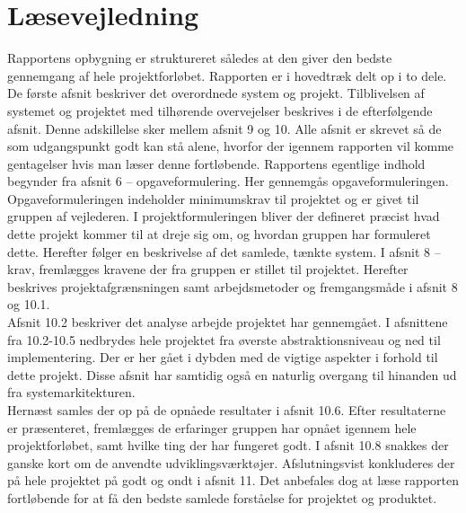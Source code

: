 \section{Læsevejledning}
Rapportens opbygning er struktureret således at den giver den bedste gennemgang af hele projektforløbet. Rapporten er i hovedtræk delt op i to dele. De første afsnit beskriver det overordnede system og projekt. Tilblivelsen af systemet og projektet med tilhørende overvejelser beskrives i de efterfølgende afsnit. Denne adskillelse sker mellem afsnit 9 og 10. Alle afsnit er skrevet så de som udgangspunkt godt kan stå alene, hvorfor der igennem rapporten vil komme gentagelser hvis man læser denne fortløbende. Rapportens egentlige indhold begynder fra afsnit 6 – opgaveformulering.  Her gennemgås opgaveformuleringen. Opgaveformuleringen indeholder minimumskrav til projektet og er givet til gruppen af vejlederen. I projektformuleringen bliver der defineret præcist hvad dette projekt kommer til at dreje sig om, og hvordan gruppen har formuleret dette. Herefter følger en beskrivelse af det samlede, tænkte system.
I afsnit 8 – krav, fremlægges kravene der fra gruppen er stillet til projektet. Herefter beskrives projektafgrænsningen samt arbejdsmetoder og fremgangsmåde i afsnit 8 og 10.1.\\
Afsnit 10.2 beskriver det analyse arbejde projektet har gennemgået. I afsnittene fra 10.2-10.5 nedbrydes hele projektet fra øverste abstraktionsniveau og ned til implementering. Der er her gået i dybden med de vigtige aspekter i forhold til dette projekt. Disse afsnit har samtidig også en naturlig overgang til hinanden ud fra systemarkitekturen. \\
Hernæst samles der op på de opnåede resultater i afsnit 10.6. Efter resultaterne er præsenteret, fremlægges de erfaringer gruppen har opnået igennem hele projektforløbet, samt hvilke ting der har fungeret godt. I afsnit 10.8 snakkes der ganske kort om de anvendte udviklingsværktøjer. Afslutningsvist konkluderes der på hele projektet på godt og ondt i afsnit 11. Det anbefales dog at læse rapporten fortløbende for at få den bedste samlede forståelse for projektet og produktet.
